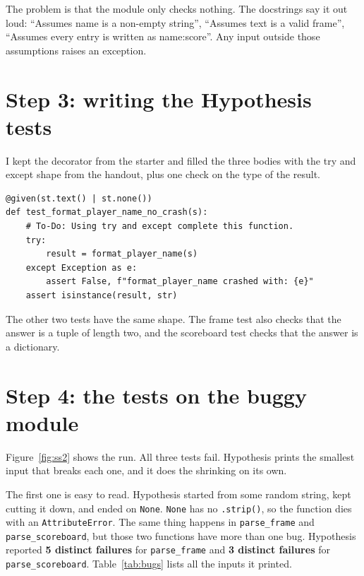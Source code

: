 \documentclass[11pt,a4paper]{article}
\begin{document}
The problem is that the module only checks nothing. The docstrings say it out loud: ``Assumes name is a non-empty string'', ``Assumes text is a valid frame'', ``Assumes every entry is written as name:score''. Any input outside those assumptions raises an exception.

\section*{Step 3: writing the Hypothesis tests}

I kept the decorator from the starter and filled the three bodies with the try and except shape from the handout, plus one check on the type of the result.

\begin{verbatim}
@given(st.text() | st.none())
def test_format_player_name_no_crash(s):
    # To-Do: Using try and except complete this function.
    try:
        result = format_player_name(s)
    except Exception as e:
        assert False, f"format_player_name crashed with: {e}"
    assert isinstance(result, str)
\end{verbatim}

The other two tests have the same shape. The frame test also checks that the answer is a tuple of length two, and the scoreboard test checks that the answer is a dictionary.

\section*{Step 4: the tests on the buggy module}

Figure~\ref{fig:ss2} shows the run. All three tests fail. Hypothesis prints the smallest input that breaks each one, and it does the shrinking on its own.

The first one is easy to read. Hypothesis started from some random string, kept cutting it down, and ended on \texttt{None}. \texttt{None} has no \texttt{.strip()}, so the function dies with an \texttt{AttributeError}. The same thing happens in \texttt{parse\_frame} and \texttt{parse\_scoreboard}, but those two functions have more than one bug. Hypothesis reported \textbf{5 distinct failures} for \texttt{parse\_frame} and \textbf{3 distinct failures} for \texttt{parse\_scoreboard}. Table~\ref{tab:bugs} lists all the inputs it printed.
\end{document}

